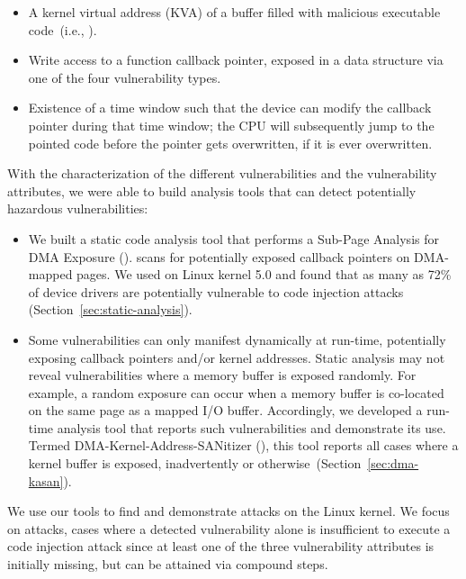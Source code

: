 \begin{itemize}
    \item A kernel virtual address (KVA) of a buffer filled with malicious executable code~(i.e., \mabaf).
    \item Write access to a function callback pointer, exposed in a data structure via one of the four \subpage vulnerability types. 
    \item Existence of a time window such that the device can modify the callback pointer during that time window; the CPU will subsequently jump to the pointed code before the pointer gets overwritten, if it is ever overwritten. 
\end{itemize} 

With the characterization of the different \subpage{} vulnerabilities and the vulnerability attributes, we were able to build analysis tools that can detect potentially hazardous \subpage{} vulnerabilities:

\begin{itemize}
    \item We built a static code analysis tool that performs a Sub-Page Analysis for DMA Exposure (\tool). \tool scans for potentially exposed callback pointers on DMA-mapped pages. We used \tool on Linux kernel 5.0 and found that as many as 72\% of device drivers are potentially vulnerable to code injection attacks (Section~\ref{sec:static-analysis}). 

    \item Some \subpage{} vulnerabilities can only manifest dynamically at run-time, potentially exposing callback pointers and/or kernel addresses. Static analysis may not reveal  vulnerabilities where a memory buffer is exposed randomly. For example, a random exposure can occur when a memory buffer is co-located on the same page as a mapped I/O buffer. Accordingly, we developed a run-time analysis tool that reports such vulnerabilities and demonstrate its use. Termed DMA-Kernel-Address-SANitizer (\dkasan), this tool reports all cases where a kernel buffer is exposed, inadvertently or otherwise~(Section~\ref{sec:dma-kasan}).
\end{itemize}

We use our tools to find and demonstrate attacks on the Linux kernel. We focus on \compound attacks, cases where a detected \subpage vulnerability alone is insufficient to execute a code injection attack since at least one of the three vulnerability attributes is initially missing, but can be attained via compound steps.

